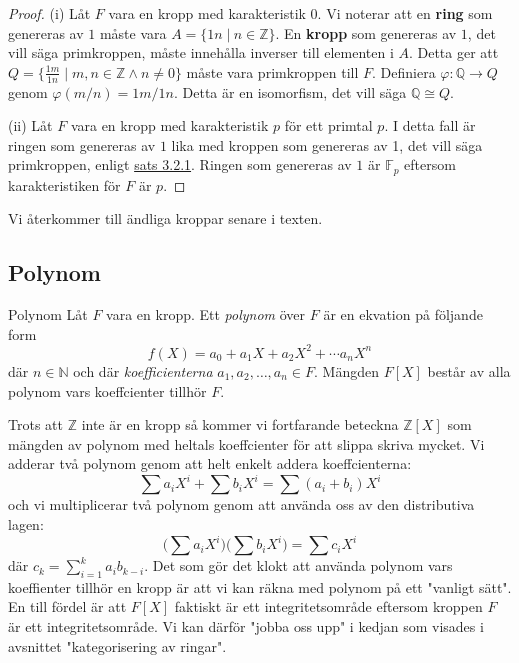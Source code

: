 \documentclass{article}
\theoremstyle{definition}
\begin{document}
\begin{proof}
  (i) Låt $F$ vara en kropp med karakteristik 0. Vi noterar att en \textbf{ring} som genereras av $1$ måste vara $A = \{1n \; | \: n \in \mathbb{Z}\}$. 
  En \textbf{kropp} som genereras av $1$, det vill säga primkroppen, måste innehålla inverser till elementen i $A$. 
  Detta ger att $Q = \{ \frac{1m}{1n} \; | \; m, n \in \mathbb{Z} \wedge  n \neq 0\}$ måste vara primkroppen till $F$. 
  Definiera $\varphi: \mathbb{Q} \rightarrow Q$ genom $\varphi(m/n) = 1m/1n$. Detta är en isomorfism, det vill säga $\mathbb{Q} \cong Q.$

  (ii) Låt $F$ vara en kropp med karakteristik $p$ för ett primtal $p.$ I detta fall är ringen som genereras av $1$ lika med 
  kroppen som genereras av 1, det vill säga primkroppen, enligt \hyperlink{zpkropp}{sats 3.2.1}. Ringen som genereras av $1$ är 
  $\mathbb{F}_p$ eftersom karakteristiken för $F$ är $p$.
\end{proof}

Vi återkommer till ändliga kroppar senare i texten.

\subsection{Polynom}
\begin{mydef}{Polynom}{}
  Låt $F$ vara en kropp. Ett \textit{polynom} över $F$ är en ekvation på följande form
  \[f(X) = a_0 + a_1X + a_2X^2 + \cdots a_nX^n\]
  där $n \in \mathbb{N}$ och där \textit{koefficienterna} $a_1, a_2, \ldots, a_n \in F$. 
  Mängden $F[X]$ består av alla polynom vars koeffcienter tillhör $F$.
\end{mydef}
Trots att $\mathbb{Z}$ inte är en kropp så kommer vi fortfarande beteckna $\mathbb{Z}[X]$ som mängden av polynom med heltals koeffcienter
för att slippa skriva mycket. Vi adderar två polynom genom att 
helt enkelt addera koeffcienterna:
\[ \sum a_iX^i + \sum b_iX^i = \sum (a_i + b_i)X^i \]
och vi multiplicerar två polynom genom att använda oss av den distributiva lagen: 
\[ \biggl( \sum a_iX^i \biggr) \biggl( \sum b_iX^i \biggr) = \sum c_iX^i \]
där $c_k = \sum_{i = 1}^k a_ib_{k-i}.$ Det som gör det klokt att använda polynom vars koeffienter tillhör en kropp är att vi kan 
räkna med polynom på ett "vanligt sätt". En till fördel är att $F[X]$ faktiskt är ett integritetsområde eftersom kroppen $F$ är ett integritetsområde. 
Vi kan därför "jobba oss upp" i kedjan som visades i avsnittet "kategorisering av ringar". 
\end{document}
